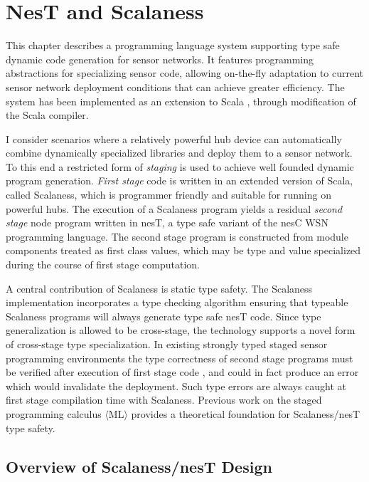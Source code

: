 
\chapter{NesT and Scalaness}
\label{chapter-nest-scalaness}


This chapter describes a programming language system supporting type safe dynamic code
generation for sensor networks. It features programming abstractions for specializing sensor
code, allowing on-the-fly adaptation to current sensor network deployment conditions that can
achieve greater efficiency. The system has been implemented as an extension to Scala
\cite{PiS2}, through modification of the Scala compiler.

I consider scenarios where a relatively powerful hub device can automatically combine
dynamically specialized libraries and deploy them to a sensor network. To this end a restricted
form of \emph{staging} \cite{Taha-MetaML,DBLP:conf/icess/Taha04,289140} is used to achieve well
founded dynamic program generation. \emph{First stage} code is written in an extended version of
Scala, called Scalaness, which is programmer friendly and suitable for running on powerful hubs.
The execution of a Scalaness program yields a residual \emph{second stage} node program written
in nesT, a type safe variant of the nesC WSN programming language. The second stage program is
constructed from module components treated as first class values, which may be type and value
specialized during the course of first stage computation.

A central contribution of Scalaness is static type safety. The Scalaness implementation
incorporates a type checking algorithm ensuring that typeable Scalaness programs will always
generate type safe nesT code. Since type generalization is allowed to be cross-stage, the
technology supports a novel form of cross-stage type specialization. In existing strongly typed
staged sensor programming environments the type correctness of second stage programs must be
verified after execution of first stage code \cite{Mainland-Flask-2008}, and could in fact
produce an error which would invalidate the deployment. Such type errors are always caught at
first stage compilation time with Scalaness. Previous work on the staged programming calculus
$\langle \text{ML} \rangle$ \cite{FramedML} provides a theoretical foundation for Scalaness/nesT
type safety.

\section{Overview of Scalaness/nesT Design}

